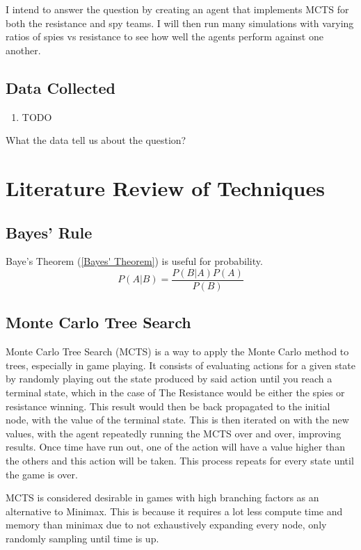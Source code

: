 \documentclass[a4paper]{article}
\begin{document}
I intend to answer the question by creating an agent that implements MCTS for both the resistance and spy teams.
I will then run many simulations with varying ratios of spies vs resistance to see how well the agents perform against one another.

\subsection{Data Collected}
\begin{enumerate}
    \item TODO
\end{enumerate}

What the data tell us about the question?

\section{Literature Review of Techniques}

\subsection{Bayes' Rule}

Baye's Theorem (\ref{Bayes' Theorem}) is useful for probability.
\begin{equation}\label{Bayes' Theorem}
    P(A | B) = \frac{P(B | A) P(A)}{P(B)}
\end{equation}

\subsection{Monte Carlo Tree Search}

Monte Carlo Tree Search (MCTS) is a way to apply the Monte Carlo method to trees, especially in game playing.
It consists of evaluating actions for a given state by randomly playing out the state produced by said action until you reach a terminal state, which in the case of The Resistance would be either the spies or resistance winning.
This result would then be back propagated to the initial node, with the value of the terminal state.
This is then iterated on with the new values, with the agent repeatedly running the MCTS over and over, improving results.
Once time have run out, one of the action will have a value higher than the others and this action will be taken.
This process repeats for every state until the game is over.

MCTS is considered desirable in games with high branching factors as an alternative to Minimax. This is because it requires a lot less compute time and memory than minimax due to not exhaustively expanding every node, only randomly sampling until time is up.
\end{document}
